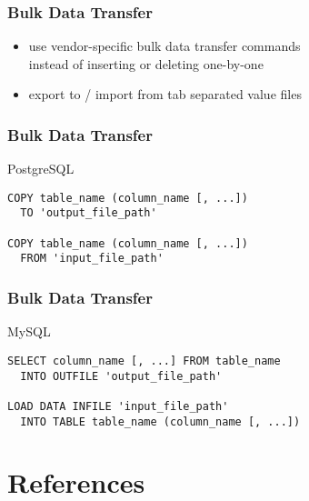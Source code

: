 \documentclass[dvipsnames]{beamer}
\theoremstyle{plain}
\begin{document}
\begin{frame}[fragile]
  \frametitle{Bulk Data Transfer}

  \begin{itemize}
    \item use vendor-specific bulk data transfer commands\\
      instead of inserting or deleting one-by-one

    \item export to / import from tab separated value files
  \end{itemize}
\end{frame}

\begin{frame}[fragile]
  \frametitle{Bulk Data Transfer}

  \begin{block}{PostgreSQL}
    \begin{lstlisting}
COPY table_name (column_name [, ...])
  TO 'output_file_path'

COPY table_name (column_name [, ...])
  FROM 'input_file_path'
    \end{lstlisting}
  \end{block}
\end{frame}

\begin{frame}[fragile]
  \frametitle{Bulk Data Transfer}

  \begin{block}{MySQL}
    \begin{lstlisting}
SELECT column_name [, ...] FROM table_name
  INTO OUTFILE 'output_file_path'

LOAD DATA INFILE 'input_file_path'
  INTO TABLE table_name (column_name [, ...])
    \end{lstlisting}
  \end{block}
\end{frame}

\section*{References}
\end{document}
